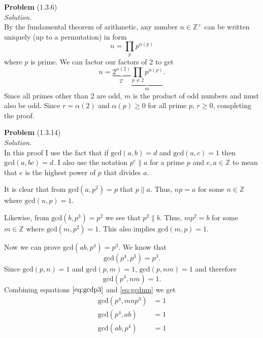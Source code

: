 \documentclass[12 pt]{amsart}
\begin{document}
\phantom{\quad} \vfill
\noindent
\textbf{Problem} (1.3.6) \\[4ex]
\emph{Solution.} \\[2ex]
  By the fundamental theorem of arithmetic, any number $n \in \mathbb{Z}^+$ can be written
  uniquely (up to a permutation) in form
  \[
    n = \prod_p p^{\alpha(p)}
  \]
  where $p$ is prime. 
  We can factor our factors of 2 to get
  \[
    n = \underbrace{2^{\alpha(2)}}_{2^r} 
        \underbrace{\prod_{p\neq 2} p^{\alpha(p)}}_{m}.
  \]
  Since all primes other than 2 are odd, $m$ is the product of odd numbers and must also be odd.
  Since $r = \alpha(2)$ and $\alpha(p) \geq 0$ for all prime $p$, $r \geq 0$, completing the
  proof.
\vfill
\newpage



\phantom{\quad} \vfill
\noindent
\textbf{Problem} (1.3.14) \\[4ex]
\emph{Solution.} \\[2ex]
  In this proof I use the fact that if 
  $\text{gcd}(a, b) = d$ 
  and 
  $\text{gcd}(a, c) = 1$ 
  then
  $\text{gcd}(a, bc) = d$.
  I also use the notation $p^e \parallel a$ for a prime $p$ and $e,a \in \mathbb{Z}$
  to mean that $e$ is the highest power of $p$ that divides $a$.

  It is clear that from 
  $\text{gcd}(a, p^2) = p$ 
  that 
  $p \parallel a$.
  Thus, $np = a$ for some $n \in \mathbb{Z}$ where 
  $\text{gcd}(n, p) = 1$.

  Likewise, from
  $\text{gcd}(b, p^3) = p^2$ 
  we see that 
  $p^2 \parallel b$.
  Thus, $mp^2 = b$ for some $m \in \mathbb{Z}$ where 
  $\text{gcd}(m, p^2) = 1$.
  This also implies
  $\text{gcd}(m, p) = 1$.

  Now we can prove
  $\text{gcd}(ab, p^4) = p^3$.
  We know that
  \begin{equation}
    \label{eq:gcdp3}
    \text{gcd}(p^4, p^3) = p^3.
  \end{equation}
  Since 
  $\text{gcd}(p, n) = 1$ 
  and 
  $\text{gcd}(p, m) = 1$,
  $\text{gcd}(p, nm) = 1$
  and therefore
  \begin{equation}
    \label{eq:gcdmn}
    \text{gcd}(p^4, nm) = 1.
  \end{equation}
  Combining equations $\ref{eq:gcdp3}$ and \ref{eq:gcdmn} we get
  \begin{align*}
    \text{gcd}(p^4, mnp^3) &= 1 \\
    \text{gcd}(p^4, ab) &= 1 \\
    \text{gcd}(ab, p^4) &= 1
  \end{align*}
\end{document}
